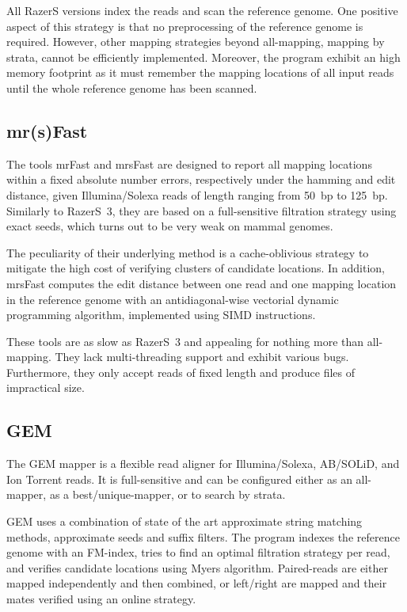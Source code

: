 All RazerS versions index the reads and scan the reference genome.
One positive aspect of this strategy is that no preprocessing of the reference genome is required.
However, other mapping strategies beyond all-mapping, \eg mapping by strata, cannot be efficiently implemented.
Moreover, the program exhibit an high memory footprint as it must remember the mapping locations of all input reads until the whole reference genome has been scanned.


\subsection{mr(s)Fast}

The tools mrFast \citep{Ahmadi2011} and mrsFast \citep{Hach2010} are designed to report all mapping locations within a fixed absolute number errors, respectively under the hamming and edit distance, given Illumina/Solexa reads of length ranging from 50~bp to 125~bp.
Similarly to RazerS~3, they are based on a full-sensitive filtration strategy using exact seeds, which turns out to be very weak on mammal genomes.

The peculiarity of their underlying method is a cache-oblivious strategy to mitigate the high cost of verifying clusters of candidate locations.
In addition, mrsFast computes the edit distance between one read and one mapping location in the reference genome with an antidiagonal-wise vectorial dynamic programming algorithm, implemented using SIMD instructions.

These tools are as slow as RazerS~3 and appealing for nothing more than all-mapping.
They lack multi-threading support and exhibit various bugs.
Furthermore, they only accept reads of fixed length and produce files of impractical size.


\subsection{GEM}

The GEM mapper \citep{Gem} is a flexible read aligner for Illumina/Solexa, AB/SOLiD, and Ion Torrent reads.
It is full-sensitive and can be configured either as an all-mapper, as a best/unique-mapper, or to search by strata.

GEM uses a combination of state of the art approximate string matching methods, \eg approximate seeds and suffix filters.
The program indexes the reference genome with an FM-index, tries to find an optimal filtration strategy per read, and verifies candidate locations using Myers algorithm.
Paired-reads are either mapped independently and then combined, or left/right are mapped and their mates verified using an online strategy.

